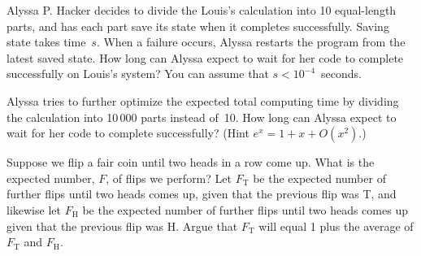 \documentclass[12pt,twoside]{article}
\begin{document}
\begin{problems}
\ppart Alyssa P. Hacker decides to divide the Louis's calculation into
10 equal-length parts, and has each part save its state when it
completes successfully. Saving state takes time~$s$. When a failure
occurs, Alyssa restarts the program from the latest saved state. How
long can Alyssa expect to wait for her code to complete successfully
on Louis's system? You can assume that $s < 10^{-4}$~seconds.


\ppart Alyssa tries to further optimize the expected total computing
time by dividing the calculation into 10\,000 parts instead of~10.
How long can Alyssa expect to wait for her code to complete
successfully? (Hint $e^x = 1 + x + O(x^2)$.)

\eparts

\problem 
\bparts

\ppart Suppose we flip a fair coin until two heads in a row come up.  What
is the expected number, $F$, of flips we perform?  \hint Let
$F_{\text{T}}$ be the expected number of further flips until two heads
comes up, given that the previous flip was T, and likewise let
$F_{\text{H}}$ be the expected number of further flips until two heads
comes up given that the previous flip was H.  Argue that $F_{\text{T}}$
will equal 1 plus the average of $F_{\text{T}}$ and $F_{\text{H}}$.


\end{problems}
\end{document}
